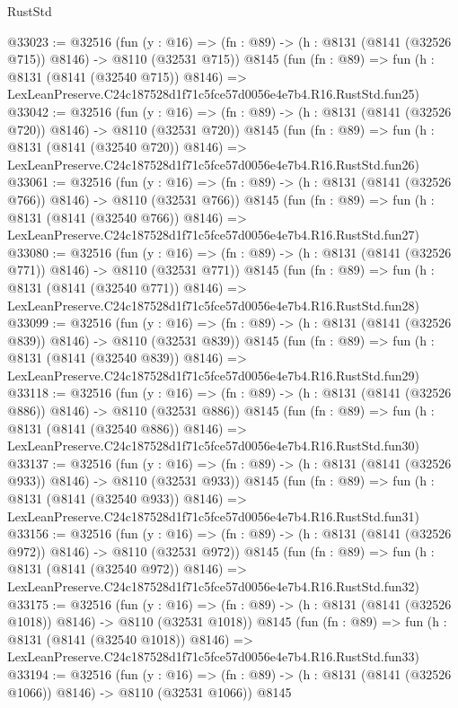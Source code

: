 \begin{lexlean}{RustStd}
\begin{coremodule}
@33023 := @32516
    (fun (y : @16) => (fn : @89) -> (h : @8131 (@8141 (@32526 @715)) @8146) -> @8110 (@32531 @715))
    @8145
    (fun (fn : @89) =>
    fun (h : @8131 (@8141 (@32540 @715)) @8146) =>
    LexLeanPreserve.C24c187528d1f71c5fce57d0056e4e7b4.R16.RustStd.fun25)
@33042 := @32516
    (fun (y : @16) => (fn : @89) -> (h : @8131 (@8141 (@32526 @720)) @8146) -> @8110 (@32531 @720))
    @8145
    (fun (fn : @89) =>
    fun (h : @8131 (@8141 (@32540 @720)) @8146) =>
    LexLeanPreserve.C24c187528d1f71c5fce57d0056e4e7b4.R16.RustStd.fun26)
@33061 := @32516
    (fun (y : @16) => (fn : @89) -> (h : @8131 (@8141 (@32526 @766)) @8146) -> @8110 (@32531 @766))
    @8145
    (fun (fn : @89) =>
    fun (h : @8131 (@8141 (@32540 @766)) @8146) =>
    LexLeanPreserve.C24c187528d1f71c5fce57d0056e4e7b4.R16.RustStd.fun27)
@33080 := @32516
    (fun (y : @16) => (fn : @89) -> (h : @8131 (@8141 (@32526 @771)) @8146) -> @8110 (@32531 @771))
    @8145
    (fun (fn : @89) =>
    fun (h : @8131 (@8141 (@32540 @771)) @8146) =>
    LexLeanPreserve.C24c187528d1f71c5fce57d0056e4e7b4.R16.RustStd.fun28)
@33099 := @32516
    (fun (y : @16) => (fn : @89) -> (h : @8131 (@8141 (@32526 @839)) @8146) -> @8110 (@32531 @839))
    @8145
    (fun (fn : @89) =>
    fun (h : @8131 (@8141 (@32540 @839)) @8146) =>
    LexLeanPreserve.C24c187528d1f71c5fce57d0056e4e7b4.R16.RustStd.fun29)
@33118 := @32516
    (fun (y : @16) => (fn : @89) -> (h : @8131 (@8141 (@32526 @886)) @8146) -> @8110 (@32531 @886))
    @8145
    (fun (fn : @89) =>
    fun (h : @8131 (@8141 (@32540 @886)) @8146) =>
    LexLeanPreserve.C24c187528d1f71c5fce57d0056e4e7b4.R16.RustStd.fun30)
@33137 := @32516
    (fun (y : @16) => (fn : @89) -> (h : @8131 (@8141 (@32526 @933)) @8146) -> @8110 (@32531 @933))
    @8145
    (fun (fn : @89) =>
    fun (h : @8131 (@8141 (@32540 @933)) @8146) =>
    LexLeanPreserve.C24c187528d1f71c5fce57d0056e4e7b4.R16.RustStd.fun31)
@33156 := @32516
    (fun (y : @16) => (fn : @89) -> (h : @8131 (@8141 (@32526 @972)) @8146) -> @8110 (@32531 @972))
    @8145
    (fun (fn : @89) =>
    fun (h : @8131 (@8141 (@32540 @972)) @8146) =>
    LexLeanPreserve.C24c187528d1f71c5fce57d0056e4e7b4.R16.RustStd.fun32)
@33175 := @32516
    (fun (y : @16) =>
    (fn : @89) -> (h : @8131 (@8141 (@32526 @1018)) @8146) -> @8110 (@32531 @1018))
    @8145
    (fun (fn : @89) =>
    fun (h : @8131 (@8141 (@32540 @1018)) @8146) =>
    LexLeanPreserve.C24c187528d1f71c5fce57d0056e4e7b4.R16.RustStd.fun33)
@33194 := @32516
    (fun (y : @16) =>
    (fn : @89) -> (h : @8131 (@8141 (@32526 @1066)) @8146) -> @8110 (@32531 @1066))
    @8145

\end{coremodule}
\end{lexlean}
